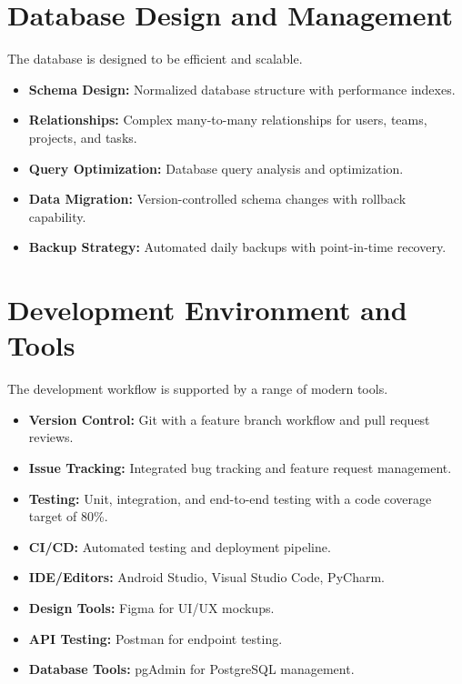 \section{Database Design and Management}
The database is designed to be efficient and scalable.
\begin{itemize}
    \item \textbf{Schema Design:} Normalized database structure with performance indexes.
    \item \textbf{Relationships:} Complex many-to-many relationships for users, teams, projects, and tasks.
    \item \textbf{Query Optimization:} Database query analysis and optimization.
    \item \textbf{Data Migration:} Version-controlled schema changes with rollback capability.
    \item \textbf{Backup Strategy:} Automated daily backups with point-in-time recovery.
\end{itemize}

\section{Development Environment and Tools}
The development workflow is supported by a range of modern tools.
\begin{itemize}
    \item \textbf{Version Control:} Git with a feature branch workflow and pull request reviews.
    \item \textbf{Issue Tracking:} Integrated bug tracking and feature request management.
    \item \textbf{Testing:} Unit, integration, and end-to-end testing with a code coverage target of 80\%.
    \item \textbf{CI/CD:} Automated testing and deployment pipeline.
    \item \textbf{IDE/Editors:} Android Studio, Visual Studio Code, PyCharm.
    \item \textbf{Design Tools:} Figma for UI/UX mockups.
    \item \textbf{API Testing:} Postman for endpoint testing.
    \item \textbf{Database Tools:} pgAdmin for PostgreSQL management.
\end{itemize}